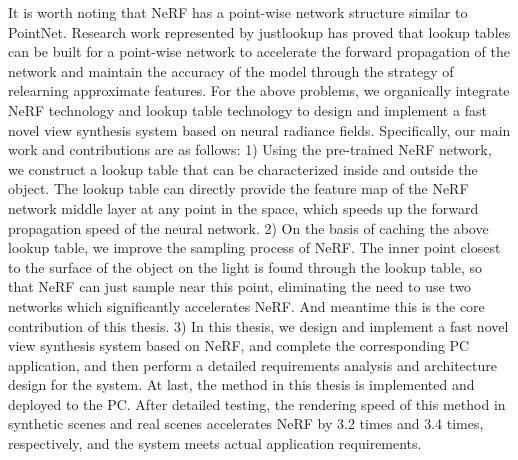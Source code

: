 \begin{abstract*}
It is worth noting that NeRF has a point-wise network structure similar to PointNet. Research work represented by justlookup has proved that lookup tables can be built for a point-wise network to accelerate the forward propagation of the network and maintain the accuracy of the model through the strategy of relearning approximate features. For the above problems, we organically integrate NeRF technology and lookup table technology to design and implement a fast novel view synthesis system based on neural radiance fields. Specifically, our main work and contributions are as follows: 1) Using the pre-trained NeRF network, we construct a lookup table that can be characterized inside and outside the object. The lookup table can directly provide the feature map of the NeRF network middle layer at any point in the space, which speeds up the forward propagation speed of the neural network. 2) On the basis of caching the above lookup table, we improve the sampling process of NeRF. The inner point closest to the surface of the object on the light is found through the lookup table, so that NeRF can just sample near this point, eliminating the need to use two networks which significantly accelerates NeRF. And meantime this is the core contribution of this thesis. 3) In this thesis, we design and implement a fast novel view synthesis system based on NeRF, and complete the corresponding PC application, and then perform a detailed requirements analysis and architecture design for the system. At last, the method in this thesis is implemented and deployed to the PC. After detailed testing, the rendering speed of this method in synthetic scenes and real scenes accelerates NeRF by 3.2 times and 3.4 times, respectively, and the system meets actual application requirements.



\end{abstract*}
